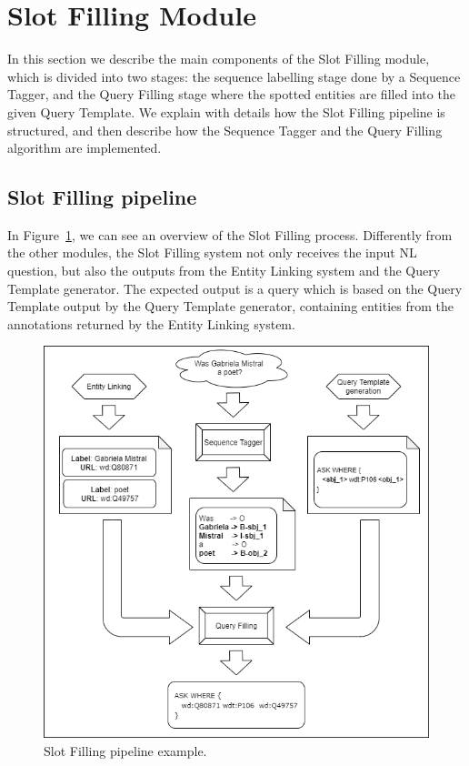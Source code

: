 \section{Slot Filling Module}
\label{cap3:system/slotFillModule}
In this section we describe the main components of the Slot Filling module, which is divided 
into two stages: the sequence labelling stage done by a Sequence Tagger, and the Query 
Filling stage where the spotted entities are filled into the given Query Template. We explain 
with details how the Slot Filling pipeline is structured, and then describe how the Sequence 
Tagger and the Query Filling algorithm are implemented.

\subsection{Slot Filling pipeline}
\label{cap3:system/slotFillModule/pipeline}
In Figure~\ref{fig:slotFillingPipeline}, we can see an overview of the Slot Filling process. 
Differently from the other modules, the Slot Filling system not only receives the input NL 
question, but also the outputs from the Entity Linking system and the Query Template generator. 
The expected output is a \SPARQL{} query which is based on the Query Template output by the 
Query Template generator, containing entities from the annotations returned by the Entity 
Linking system.

\begin{figure}[!h]
    \centering
    \includegraphics[scale=.5]{imagenes/3_system_overview/slotFillingPipeline.png}
    \caption{Slot Filling pipeline example.}
    \label{fig:slotFillingPipeline}
\end{figure}

